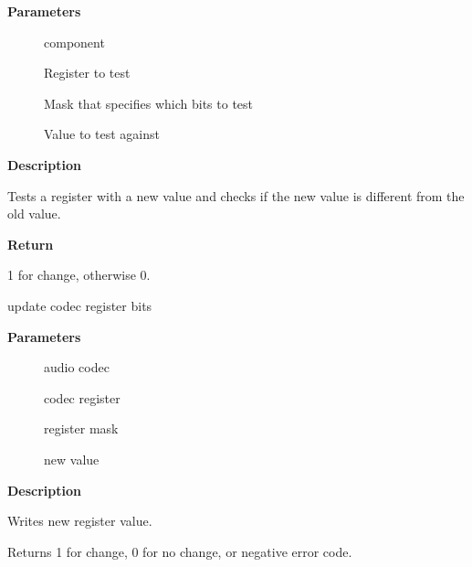 \documentclass[a4paper,8pt,english]{sphinxmanual}
\begin{document}
\textbf{Parameters}
\begin{description}
\item[{}] \leavevmode
component

\item[{}] \leavevmode
Register to test

\item[{}] \leavevmode
Mask that specifies which bits to test

\item[{}] \leavevmode
Value to test against

\end{description}

\textbf{Description}

Tests a register with a new value and checks if the new value is
different from the old value.

\textbf{Return}

1 for change, otherwise 0.

\begin{fulllineitems}
\label{sound/kernel-api/alsa-driver-api:c.snd_soc_update_bits}
update codec register bits

\end{fulllineitems}


\textbf{Parameters}
\begin{description}
\item[{}] \leavevmode
audio codec

\item[{}] \leavevmode
codec register

\item[{}] \leavevmode
register mask

\item[{}] \leavevmode
new value

\end{description}

\textbf{Description}

Writes new register value.

Returns 1 for change, 0 for no change, or negative error code.
\end{document}
